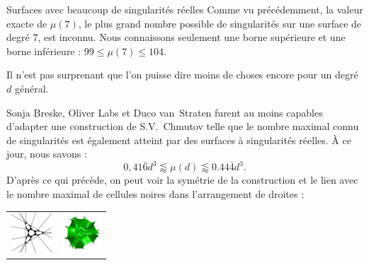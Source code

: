 \begin{surferPage}[216 Singularities]{Surfaces avec beaucoup de singularités réelles}
    Comme vu précédemment, la valeur exacte de $\mu(7)$, le plus grand nombre possible
    de singularités sur une surface de degré $7$, est inconnu.
    Nous connaissons seulement une borne supérieure et une borne inférieure : $99\le \mu(7) \le 104$. 


    Il n'est pas surprenant que l'on puisse dire moins de choses encore pour un degré $d$ général.

    Sonja Breske, Oliver Labs et Duco van~Straten furent au moins capables d'adapter
    une construction de S.V.\ Chmutov telle que le nombre maximal connu
    de singularités est également atteint par des surfaces à 
    singularités réelles. 
    \`A ce jour, nous savons :
    \[0,41\bar{6}d^3 \lessapprox \mu(d) \lessapprox 0.44\bar{4} d^3.\]
     D'après ce qui précède, on peut voir la symétrie de la construction et le lien avec 
    le nombre maximal de cellules noires dans l'arrangement de droites :
    \begin{center}
      \begin{tabular}{c@{\qquad}c}
        \includegraphics[height=1.5cm]{./../../common/images/vielesing.pdf}
        &
        \includegraphics[height=1.5cm]{./../../common/images/p9surface_von_oben}
      \end{tabular}
    \end{center}
\end{surferPage}
